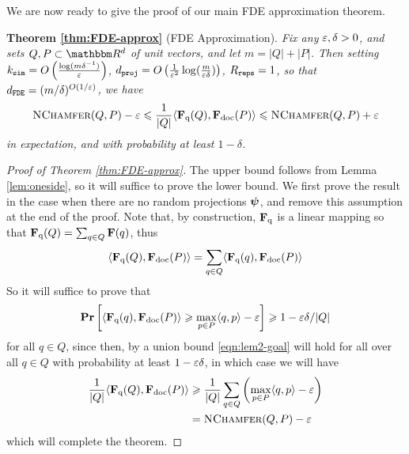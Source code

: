 We are now ready to give the proof of our main FDE approximation theorem. 

\textbf{Theorem \ref{thm:FDE-approx} }(FDE Approximation). {\it
 Fix any $\varepsilon ,\delta > 0$, and sets $Q,P \subset \R^d$ of unit vectors, and let $m=|Q| + |P|$. 
Then setting $k_{\texttt{sim}} = O\left(\frac{\log (m\delta^{-1})}{\varepsilon}\right)$, $d_{\texttt{proj}} = O\left(\frac{1}{\varepsilon^2}  \log (\frac{m}{\varepsilon\delta})\right)$, $R_{\texttt{reps}} = 1$, so that $d_{\texttt{FDE}} = (m/\delta)^{O(1/\varepsilon)}$, %
we have
 \[  \textsc{NChamfer}(Q,P)  - \varepsilon \leqslant \frac{1}{|Q|}\langle \mathbf{F}_{\text{q}}(Q) , \mathbf{F}_{\text{doc}}(P) \rangle \leqslant  \textsc{NChamfer}(Q,P) + \varepsilon  \]
 in expectation, and with probability at least $1-\delta$. 
}
\begin{proof}[Proof of Theorem \ref{thm:FDE-approx}]

The upper bound follows from Lemma \ref{lem:oneside}, so it will suffice to prove the lower bound. 
We first prove the result in the case when there are no random projections $\boldsymbol{\psi}$, and remove this assumption at the end of the proof.
 Note that, by construction, $\mathbf{F}_{\text{q}}$ is a linear mapping so that $\mathbf{F}_{\text{q}}(Q) = \sum_{q \in Q} \mathbf{F}(q)$, thus
       \[ \langle \mathbf{F}_{\text{q}}(Q) , \mathbf{F}_{\text{doc}}(P) \rangle = \sum_{q \in Q} \langle \mathbf{F}_{\text{q}}(q) , \mathbf{F}_{\text{doc}}(P) \rangle \]
So it will suffice to prove that 
\begin{equation}\label{eqn:lem2-goal}
 \operatorname{{\bf Pr}}\left[  \langle \mathbf{F}_{\text{q}}(q) , \mathbf{F}_{\text{doc}}(P) \rangle \geqslant  \max_{p \in P} \langle q,p\rangle  - \varepsilon \right] \geqslant 1-\varepsilon \delta/|Q|
\end{equation}
 for all $q \in Q$, since then, by a union bound \ref{eqn:lem2-goal} will hold for all over all $q \in Q$ with probability at least  $1-\varepsilon \delta$, in which case we will have 
 \begin{equation}
     \begin{split}
         \frac{1}{|Q|}\langle \mathbf{F}_{\text{q}}(Q) , \mathbf{F}_{\text{doc}}(P) \rangle &\geqslant \frac{1}{|Q|}\sum_{q \in Q}\left( \max_{p \in P} \langle q,p\rangle -\varepsilon \right)  \\
         & = \textsc{NChamfer}(Q,P) - \varepsilon
     \end{split}
 \end{equation}
which will complete the theorem.

 
 

\end{proof}

